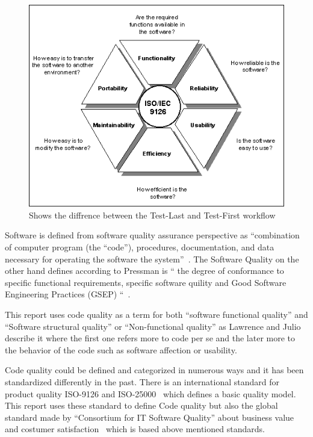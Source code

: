 
\begin{figure}
\begin{center}
\includegraphics[scale=0.8]{9126ref.png}
\caption{Shows the diffrence between the Test-Last and Test-First workflow}
\end{center}
\end{figure}

Software is defined from software quality assurance perspective as “combination of computer program (the “code”), procedures, documentation, and data necessary for operating the software the system”~\cite{Galin}. The Software Quality on the other hand defines according to Pressman is “ the degree of conformance to specific functional requirements, specific software quility and Good Software Engineering Practices (GSEP) “~\cite{Pressman}.

This report uses code quality as a term for both “software functional quality” and “Software structural quality” or “Non-functional quality” as Lawrence and Julio~\cite{Chung} describe it where the first one refers more to code per se and the later more to the behavior of the code such as software affection or usability. 

Code quality could be defined and categorized in numerous ways and it has been standardized differently in the past. There is an international standard for product quality ISO-9126 and ISO-25000~\cite{ISO9126}  which defines a basic quality model. This report uses these standard to define Code quality but also the global standard made by “Consortium for IT Software Quality” about business value and costumer satisfaction~\cite{cisq} which is based above mentioned standards. 

